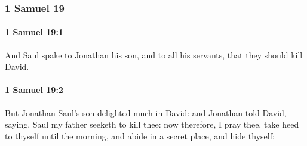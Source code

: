 	\subsubsection{1 Samuel 19} %
		\label{1SAMUEL-19}

		\paragraph{1 Samuel 19:1} %
			\label{1SAMUEL-19-1}

			And Saul spake to Jonathan his son, and to all his servants, that they should kill David.


		\paragraph{1 Samuel 19:2} %
			\label{1SAMUEL-19-2}

			But Jonathan Saul’s son delighted much in David: and Jonathan told David, saying, Saul my father seeketh to kill thee: now therefore, I pray thee, take heed to thyself until the morning, and abide in a secret place, and hide thyself:

